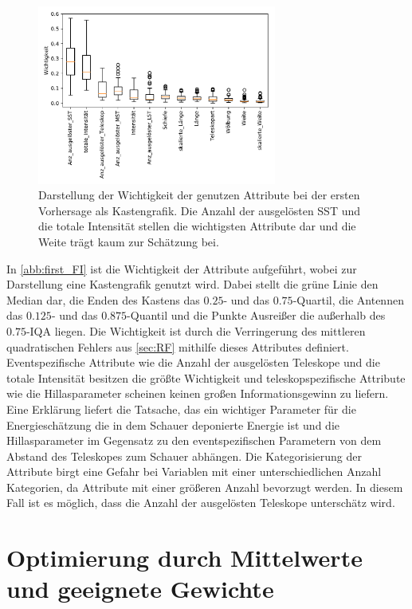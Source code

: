 \begin{figure}
  \includegraphics[width=0.7\textwidth]{Plots/feautureimportance_boxplot_firstForest.pdf}
  \centering
  \caption{Darstellung der Wichtigkeit der genutzen Attribute bei der ersten Vorhersage als Kastengrafik. Die Anzahl der ausgelösten SST und die totale Intensität
          stellen die wichtigsten Attribute dar und die Weite trägt kaum zur Schätzung bei.}
  \label{abb:first_FI}
\end{figure}
In \autoref{abb:first_FI} ist die Wichtigkeit der Attribute aufgeführt, wobei zur Darstellung eine Kastengrafik genutzt wird.
Dabei stellt die grüne Linie den Median dar, die Enden des Kastens das $\num{0.25}$- und das $\num{0.75}$-Quartil, die Antennen das $\num{0.125}$- und das
$\num{0.875}$-Quantil und die Punkte Ausreißer die außerhalb des $\num{0.75}$-IQA liegen.
Die Wichtigkeit ist durch die Verringerung des mittleren quadratischen Fehlers aus \autoref{sec:RF} mithilfe dieses
Attributes definiert.
Eventspezifische Attribute wie die Anzahl der ausgelösten Teleskope und die totale Intensität besitzen die größte Wichtigkeit und teleskopspezifische Attribute
wie die Hillasparameter scheinen keinen großen Informationsgewinn zu liefern.
Eine Erklärung liefert die Tatsache, das ein wichtiger Parameter für die Energieschätzung die in dem Schauer deponierte Energie ist und die Hillasparameter im
Gegensatz zu den eventspezifischen Parametern von dem Abstand des Teleskopes zum Schauer abhängen.
Die Kategorisierung der Attribute birgt eine Gefahr bei Variablen mit einer unterschiedlichen Anzahl Kategorien, da Attribute mit einer größeren Anzahl
bevorzugt werden\cite{feature_importance}.
In diesem Fall ist es möglich, dass die Anzahl der ausgelösten Teleskope unterschätz wird.

\section{Optimierung durch Mittelwerte und geeignete Gewichte}

